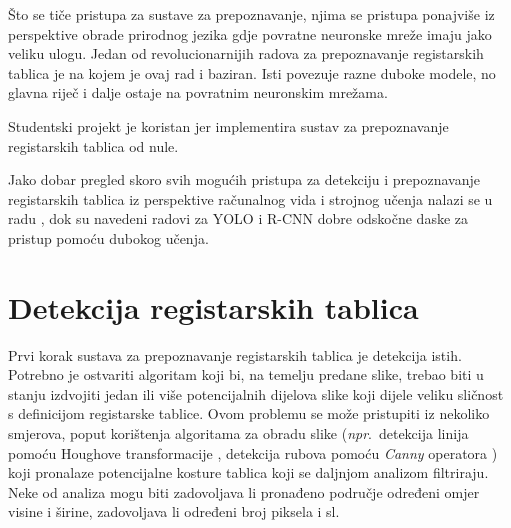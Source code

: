 \documentclass[times, utf8, diplomski]{fer}
\begin{document}
Što se tiče pristupa za sustave za prepoznavanje, njima se pristupa ponajviše iz perspektive obrade prirodnog jezika  gdje povratne neuronske mreže imaju jako veliku ulogu. Jedan od revolucionarnijih radova za prepoznavanje registarskih tablica je \citep{crnn-paper} na kojem je ovaj rad i baziran. Isti povezuje razne duboke modele, no glavna riječ i dalje ostaje na povratnim neuronskim mrežama.

Studentski projekt \citep{zemris} je koristan jer implementira sustav za prepoznavanje registarskih tablica od nule.

Jako dobar pregled skoro svih mogućih pristupa za detekciju i prepoznavanje registarskih tablica iz perspektive računalnog vida i strojnog učenja nalazi se u radu \citep{survey}, dok su navedeni radovi za YOLO i R-CNN dobre odskočne daske za pristup pomoću dubokog učenja.


\chapter{Detekcija registarskih tablica}
Prvi korak sustava za prepoznavanje registarskih tablica je detekcija istih. Potrebno je ostvariti algoritam koji bi, na temelju predane slike, trebao biti u stanju izdvojiti jedan ili više potencijalnih dijelova slike koji dijele veliku sličnost s definicijom registarske tablice. Ovom problemu se može pristupiti iz nekoliko smjerova, poput korištenja algoritama za obradu slike (\textit{npr}.\ detekcija linija pomoću Houghove transformacije \citep{hough-paper}, detekcija rubova pomoću \textit{Canny} operatora \citep{canny-paper}) koji pronalaze potencijalne kosture tablica koji se daljnjom analizom filtriraju. Neke od analiza mogu biti zadovoljava li pronađeno područje određeni omjer visine i širine,  zadovoljava li određeni broj piksela i sl.
\end{document}
